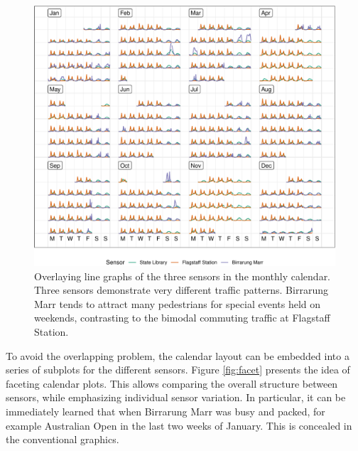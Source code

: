 \documentclass[12pt]{article}
\begin{document}
\begin{figure}

{\centering \includegraphics[width=\textwidth]{figure/overlay-1} 

}

\caption{Overlaying line graphs of the three sensors in the monthly calendar. Three sensors demonstrate very different traffic patterns. Birrarung Marr tends to attract many pedestrians for special events held on weekends, contrasting to the bimodal commuting traffic at Flagstaff Station.}\label{fig:overlay}
\end{figure}

To avoid the overlapping problem, the calendar layout can be embedded
into a series of subplots for the different sensors. Figure
\ref{fig:facet} presents the idea of faceting calendar plots. This
allows comparing the overall structure between sensors, while
emphasizing individual sensor variation. In particular, it can be
immediately learned that when Birrarung Marr was busy and packed, for
example Australian Open in the last two weeks of January. This is
concealed in the conventional graphics.
\end{document}
